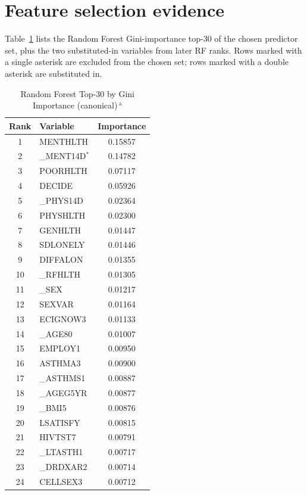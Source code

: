 \documentclass[conference]{IEEEtran}
\begin{document}
\appendix
\section{Feature selection evidence}

Table~\ref{app:rf} lists the Random Forest Gini-importance top-30 of the chosen predictor set, plus the two substituted-in variables from later RF ranks. Rows marked with a single asterisk are excluded from the chosen set; rows marked with a double asterisk are substituted in.

\begin{table}[H]
\caption{Random Forest Top-30 by Gini Importance (canonical)\,$^{\mathrm{a}}$}
\label{app:rf}
\centering
\scriptsize
\setlength{\tabcolsep}{3pt}
\renewcommand{\arraystretch}{1.1}
\begin{tabular}{|c|l|c|}
\hline
\textbf{Rank} & \textbf{Variable} & \textbf{Importance} \\
\hline
1  & MENTHLTH   & 0.15857 \\
2  & \_MENT14D$^{*}$  & 0.14782 \\
3  & POORHLTH   & 0.07117 \\
4  & DECIDE     & 0.05926 \\
5  & \_PHYS14D  & 0.02364 \\
6  & PHYSHLTH   & 0.02300 \\
7  & GENHLTH    & 0.01447 \\
8  & SDLONELY   & 0.01446 \\
9  & DIFFALON   & 0.01355 \\
10 & \_RFHLTH   & 0.01305 \\
11 & \_SEX      & 0.01217 \\
12 & SEXVAR     & 0.01164 \\
13 & ECIGNOW3   & 0.01133 \\
14 & \_AGE80    & 0.01007 \\
15 & EMPLOY1    & 0.00950 \\
16 & ASTHMA3    & 0.00900 \\
17 & \_ASTHMS1  & 0.00887 \\
18 & \_AGEG5YR  & 0.00877 \\
19 & \_BMI5     & 0.00876 \\
20 & LSATISFY   & 0.00815 \\
21 & HIVTST7    & 0.00791 \\
22 & \_LTASTH1  & 0.00717 \\
23 & \_DRDXAR2  & 0.00714 \\
24 & CELLSEX3   & 0.00712 \\

\end{tabular}
\end{table}
\end{document}
